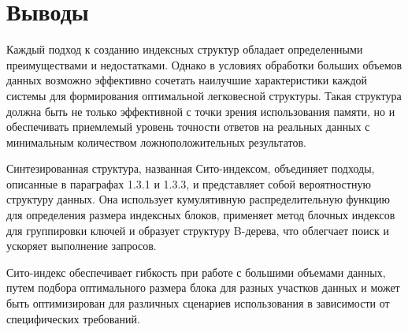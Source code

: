 \section*{Выводы}

Каждый подход к созданию индексных структур обладает определенными преимуществами и недостатками. Однако в условиях обработки больших объемов данных возможно эффективно сочетать наилучшие характеристики каждой системы для формирования оптимальной легковесной структуры. Такая структура должна быть не только эффективной с точки зрения использования памяти, но и обеспечивать приемлемый уровень точности ответов на реальных данных с минимальным количеством ложноположительных результатов.

Синтезированная структура, названная Сито-индексом, объединяет подходы, описанные в параграфах 1.3.1 и 1.3.3, и представляет собой вероятностную структуру данных. Она использует кумулятивную распределительную функцию для определения размера индексных блоков, применяет метод блочных индексов для группировки ключей и образует структуру B-дерева, что облегчает поиск и ускоряет выполнение запросов.

Сито-индекс обеспечивает гибкость при работе с большими объемами данных, путем подбора оптимального размера блока для разных участков данных и может быть оптимизирован для различных сценариев использования в зависимости от специфических требований.
